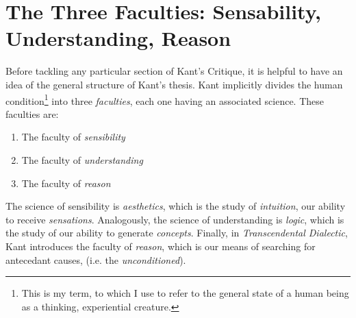 \section*{The Three Faculties: Sensability, Understanding, Reason}
Before tackling any particular section of Kant's Critique, it is helpful to have an idea of the general structure of Kant's thesis. Kant implicitly divides the human condition\footnote{This is my term, to which I use to refer to the general state of a human being as a thinking, experiential creature.} into three \emph{faculties}, each one having an associated science. These faculties are:

\begin{enumerate}
  \item The faculty of \emph{sensibility}
  \item The faculty of \emph{understanding}
  \item The faculty of \emph{reason}
\end{enumerate}

\noindent
The science of sensibility is \emph{aesthetics}, which is the study of \emph{intuition}, our ability to receive \emph{sensations}. Analogously, the science of understanding is \emph{logic}, which is the study of our ability to generate \emph{concepts}. Finally, in \emph{Transcendental Dialectic}, Kant introduces the faculty of \emph{reason}, which is our means of searching for antecedant causes, (i.e. the \emph{unconditioned}).
